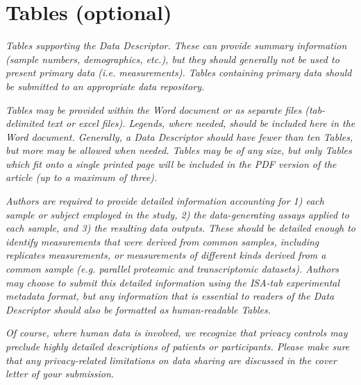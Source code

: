 \section{Tables (optional)}

\textit{Tables supporting the Data Descriptor.  These can provide summary information (sample numbers, demographics, etc.), but they should generally not be used to present primary data (i.e. measurements). Tables containing primary data should be submitted to an appropriate data repository. }

\textit{Tables may be provided within the Word document or as separate files (tab-delimited text or excel files).  Legends, where needed, should be included here in the Word document. Generally, a Data Descriptor should have fewer than ten Tables, but more may be allowed when needed. Tables may be of any size, but only Tables which fit onto a single printed page will be included in the PDF version of the article (up to a maximum of three).   }

\textit{Authors are required to provide detailed information accounting for 1) each sample or subject employed in the study, 2) the data-generating assays applied to each sample, and 3) the resulting data outputs. These should be detailed enough to identify measurements that were derived from common samples, including replicates measurements, or measurements of different kinds derived from a common sample (e.g. parallel proteomic and transcriptomic datasets). Authors may choose to submit this detailed information using the ISA-tab experimental metadata format, but any information that is essential to readers of the Data Descriptor should also be formatted as human-readable Tables. }

\textit{Of course, where human data is involved, we recognize that privacy controls may preclude highly detailed descriptions of patients or participants. Please make sure that any privacy-related limitations on data sharing are discussed in the cover letter of your submission.  }
